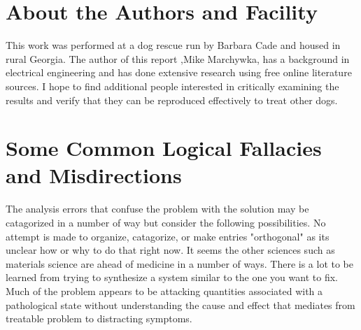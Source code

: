 \begin{mdpicomment}
\section{About the Authors and Facility}
This work was performed at a dog rescue run by Barbara Cade and
housed in rural Georgia.  The author of this report 
,Mike Marchywka,
has a background in electrical engineering and 
has done extensive research using free online literature sources.  
I hope to find additional people interested in critically 
examining the results and verify that they can be reproduced
effectively to treat other dogs.

\section{Some Common Logical Fallacies and Misdirections}
\label{appendix:errors}

The analysis errors that confuse the problem with the
solution may be catagorized in a number of way but
consider the following possibilities. No attempt is made
to organize, catagorize, or make entries "orthogonal"
as its unclear how or why to do that right now.  
It seems the other sciences such as materials science are
ahead of medicine in a number of ways. There is a lot to
be learned from trying to synthesize a system similar to the
one you want to fix. Much of the problem appears to be attacking
quantities associated with a pathological state without understanding
the cause and effect that mediates from treatable problem to
distracting symptoms. 



\end{mdpicomment}
